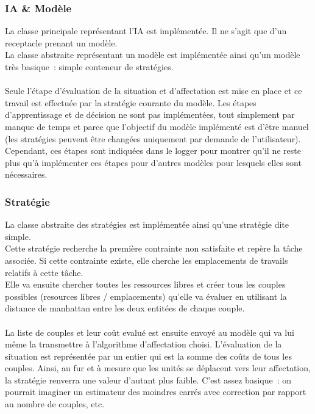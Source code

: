 \subsubsection{IA \& Modèle}

La classe principale représentant l'IA est implémentée. Il ne s'agit que d'un receptacle prenant un modèle.\\
La classe abstraite représentant un modèle est implémentée ainsi qu'un modèle très basique~: simple conteneur de stratégies.\\\\

Seule l'étape d'évaluation de la situation et d'affectation est mise en place et ce travail est effectuée par la stratégie courante du modèle. Les étapes d'apprentissage et de décision ne sont pas implémentées, tout simplement par manque de temps et parce que l'objectif du modèle implémenté est d'être manuel (les stratégies peuvent être changées uniquement par demande de l'utilisateur).\\
Cependant, ces étapes sont indiquées dans le logger pour montrer qu'il ne reste plus qu'à implémenter ces étapes pour d'autres modèles pour lesquels elles sont nécessaires.

\subsubsection{Stratégie}

La classe abstraite des stratégies est implémentée ainsi qu'une stratégie dite simple.\\
Cette stratégie recherche la première contrainte non satisfaite et repère la tâche associée. Si cette contrainte existe, elle cherche les emplacements de travails relatifs à cette tâche.\\
Elle va ensuite chercher toutes les ressources libres et créer tous les couples possibles (resources libres / emplacements) qu'elle va évaluer en utilisant la distance de manhattan entre les deux entitées de chaque couple.\\\\

La liste de couples et leur coût evalué est ensuite envoyé au modèle qui va lui même la transmettre à l'algorithme d'affectation choisi. L'évaluation de la situation est représentée par un entier qui est la somme des coûts de tous les couples. Ainsi, au fur et à mesure que les unités se déplacent vers leur affectation, la stratégie renverra une valeur d'autant plus faible. C'est assez basique~: on pourrait imaginer un estimateur des moindres carrés avec correction par rapport au nombre de couples, etc.

